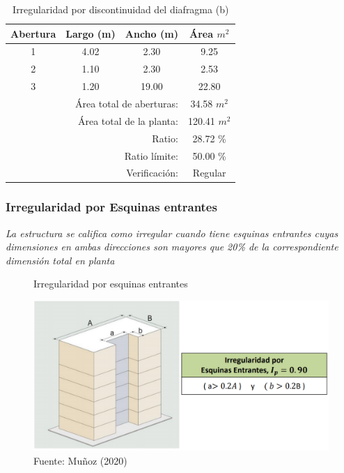 \documentclass{article}%
\begin{document}
\begin{table}[H]%
\centering%
\caption{Irregularidad por discontinuidad del diafragma (b)}%
\begin{tabular}{cccc}%
\hline%
\textbf{Abertura}&\textbf{Largo (m)}&\textbf{Ancho (m)}&\textbf{Área $m^2$}\\%
\hline%
1&4.02&2.30&9.25\\%
\hline%
2&1.10&2.30&2.53\\%
\hline%
3&1.20&19.00&22.80\\%
\hline%
&\multicolumn{2}{r}{Área total de aberturas:}&34.58 $m^2$\\%
&\multicolumn{2}{r}{Área total de la planta:}&120.41 $m^2$\\%
&\multicolumn{2}{r}{Ratio:}&28.72 \%\\%
&\multicolumn{2}{r}{Ratio límite:}&50.00 \%\\%
&\multicolumn{2}{r}{Verificación:}&\textcolor[rgb]{ .267,  .447,  .769} {Regular}\\%
\end{tabular}%
\end{table}

%
\subsubsection{Irregularidad por Esquinas entrantes}%
\label{ssubsec:IrregularidadporEsquinasentrantes}%
\begin{tcolorbox}[colback=gray!5!white,colframe=cyan!75!black,fonttitle=\bfseries,title=Tabla N°9 E-030]%
\textit{La estructura se califica como irregular cuando tiene esquinas entrantes  cuyas  dimensiones  en  ambas  direcciones  son mayores que 20\% de la correspondiente dimensión total en planta}%
\end{tcolorbox}%


\begin{figure}[H]%
\centering%
\caption{Irregularidad por esquinas entrantes}%
\includegraphics[scale=0.5]{images/i_esquinas.PNG}%
\caption*{\small Fuente: Muñoz (2020)}%
\end{figure}
\end{document}
